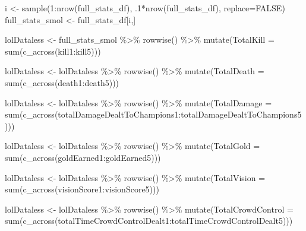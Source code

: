 \documentclass[
]{article}
\newenvironment{Shaded}{\begin{snugshade}}{\end{snugshade}}
\newcommand{\AttributeTok}[1]{\textcolor[rgb]{0.77,0.63,0.00}{#1}}
\newcommand{\ConstantTok}[1]{\textcolor[rgb]{0.00,0.00,0.00}{#1}}
\newcommand{\DecValTok}[1]{\textcolor[rgb]{0.00,0.00,0.81}{#1}}
\newcommand{\FunctionTok}[1]{\textcolor[rgb]{0.00,0.00,0.00}{#1}}
\newcommand{\NormalTok}[1]{#1}
\newcommand{\OtherTok}[1]{\textcolor[rgb]{0.56,0.35,0.01}{#1}}
\newcommand{\SpecialCharTok}[1]{\textcolor[rgb]{0.00,0.00,0.00}{#1}}
\begin{document}
\begin{Shaded}
\begin{Highlighting}[]
\NormalTok{i }\OtherTok{\textless{}{-}} \FunctionTok{sample}\NormalTok{(}\DecValTok{1}\SpecialCharTok{:}\FunctionTok{nrow}\NormalTok{(full\_stats\_df), .}\DecValTok{1}\SpecialCharTok{*}\FunctionTok{nrow}\NormalTok{(full\_stats\_df), }\AttributeTok{replace=}\ConstantTok{FALSE}\NormalTok{)}
\NormalTok{full\_stats\_smol }\OtherTok{\textless{}{-}}\NormalTok{ full\_stats\_df[i,]}

\NormalTok{lolDataless }\OtherTok{\textless{}{-}}\NormalTok{ full\_stats\_smol }\SpecialCharTok{\%\textgreater{}\%} \FunctionTok{rowwise}\NormalTok{() }\SpecialCharTok{\%\textgreater{}\%} \FunctionTok{mutate}\NormalTok{(}\AttributeTok{TotalKill =} \FunctionTok{sum}\NormalTok{(}\FunctionTok{c\_across}\NormalTok{(kill1}\SpecialCharTok{:}\NormalTok{kill5)))}

\NormalTok{lolDataless }\OtherTok{\textless{}{-}}\NormalTok{ lolDataless }\SpecialCharTok{\%\textgreater{}\%} \FunctionTok{rowwise}\NormalTok{() }\SpecialCharTok{\%\textgreater{}\%} \FunctionTok{mutate}\NormalTok{(}\AttributeTok{TotalDeath =} \FunctionTok{sum}\NormalTok{(}\FunctionTok{c\_across}\NormalTok{(death1}\SpecialCharTok{:}\NormalTok{death5)))}

\NormalTok{lolDataless }\OtherTok{\textless{}{-}}\NormalTok{ lolDataless }\SpecialCharTok{\%\textgreater{}\%} \FunctionTok{rowwise}\NormalTok{() }\SpecialCharTok{\%\textgreater{}\%} \FunctionTok{mutate}\NormalTok{(}\AttributeTok{TotalDamage =} \FunctionTok{sum}\NormalTok{(}\FunctionTok{c\_across}\NormalTok{(totalDamageDealtToChampions1}\SpecialCharTok{:}\NormalTok{totalDamageDealtToChampions5)))}

\NormalTok{lolDataless }\OtherTok{\textless{}{-}}\NormalTok{ lolDataless }\SpecialCharTok{\%\textgreater{}\%} \FunctionTok{rowwise}\NormalTok{() }\SpecialCharTok{\%\textgreater{}\%} \FunctionTok{mutate}\NormalTok{(}\AttributeTok{TotalGold =} \FunctionTok{sum}\NormalTok{(}\FunctionTok{c\_across}\NormalTok{(goldEarned1}\SpecialCharTok{:}\NormalTok{goldEarned5)))}

\NormalTok{lolDataless }\OtherTok{\textless{}{-}}\NormalTok{ lolDataless }\SpecialCharTok{\%\textgreater{}\%} \FunctionTok{rowwise}\NormalTok{() }\SpecialCharTok{\%\textgreater{}\%} \FunctionTok{mutate}\NormalTok{(}\AttributeTok{TotalVision =} \FunctionTok{sum}\NormalTok{(}\FunctionTok{c\_across}\NormalTok{(visionScore1}\SpecialCharTok{:}\NormalTok{visionScore5)))}

\NormalTok{lolDataless }\OtherTok{\textless{}{-}}\NormalTok{ lolDataless }\SpecialCharTok{\%\textgreater{}\%} \FunctionTok{rowwise}\NormalTok{() }\SpecialCharTok{\%\textgreater{}\%} \FunctionTok{mutate}\NormalTok{(}\AttributeTok{TotalCrowdControl =} \FunctionTok{sum}\NormalTok{(}\FunctionTok{c\_across}\NormalTok{(totalTimeCrowdControlDealt1}\SpecialCharTok{:}\NormalTok{totalTimeCrowdControlDealt5)))}


\end{Highlighting}
\end{Shaded}
\end{document}
